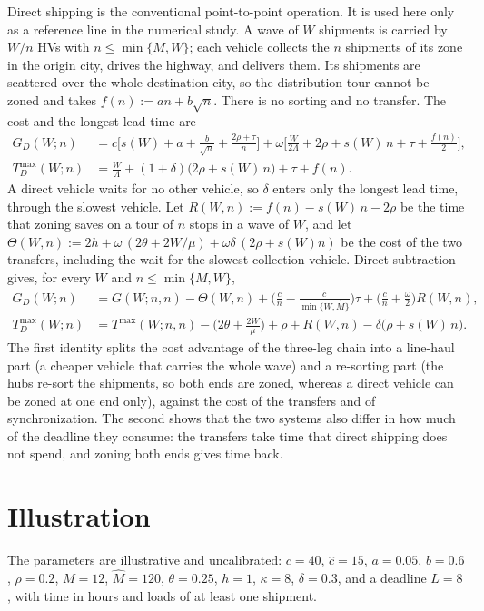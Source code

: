 \documentclass[10pt, reqno]{amsart}
\theoremstyle{definition}
\begin{document}
Direct shipping is the conventional point-to-point operation. It is used here only as a reference line in the numerical study. A wave of $W$ shipments is carried by $W/n$ HVs with $n\le\min\{M,W\}$; each vehicle collects the $n$ shipments of its zone in the origin city, drives the highway, and delivers them. Its shipments are scattered over the whole destination city, so the distribution tour cannot be zoned and takes $f(n):=an+b\sqrt n$. There is no sorting and no transfer. The cost and the longest lead time are
\begin{align}
G_D(W;n)&=c\Big[s(W)+a+\frac{b}{\sqrt n}+\frac{2\rho+\tau}{n}\Big]+\omega\Big[\frac{W}{2\Lambda}+2\rho+s(W)\,n+\tau+\frac{f(n)}{2}\Big],\label{eq:GD}\\
T_D^{\max}(W;n)&=\frac W\Lambda+(1+\delta)\big(2\rho+s(W)\,n\big)+\tau+f(n).\label{eq:TD}
\end{align}
A direct vehicle waits for no other vehicle, so $\delta$ enters only the longest lead time, through the slowest vehicle. Let $R(W,n):=f(n)-s(W)\,n-2\rho$ be the time that zoning saves on a tour of $n$ stops in a wave of $W$, and let $\Theta(W,n):=2h+\omega\,(2\theta+2W/\mu)+\omega\delta\,(2\rho+s(W)n)$ be the cost of the two transfers, including the wait for the slowest collection vehicle. Direct subtraction gives, for every $W$ and $n\le\min\{M,W\}$,
\begin{align}
G_D(W;n)&=G(W;n,n)-\Theta(W,n)+\Big(\frac cn-\frac{\hat c}{\min\{W,\hat M\}}\Big)\tau+\Big(\frac cn+\frac\omega2\Big)R(W,n),\label{eq:identity}\\
T_D^{\max}(W;n)&=T^{\max}(W;n,n)-\Big(2\theta+\frac{2W}{\mu}\Big)+\rho+R(W,n)-\delta\big(\rho+s(W)\,n\big).\label{eq:identityT}
\end{align}
The first identity splits the cost advantage of the three-leg chain into a line-haul part (a cheaper vehicle that carries the whole wave) and a re-sorting part (the hubs re-sort the shipments, so both ends are zoned, whereas a direct vehicle can be zoned at one end only), against the cost of the transfers and of synchronization. The second shows that the two systems also differ in how much of the deadline they consume: the transfers take time that direct shipping does not spend, and zoning both ends gives time back.

\section{Illustration}\label{sec:illustration}

The parameters are illustrative and uncalibrated: $c=40$, $\hat c=15$, $a=0.05$, $b=0.6$, $\rho=0.2$, $M=12$, $\hat M=120$, $\theta=0.25$, $h=1$, $\kappa=8$, $\delta=0.3$, and a deadline $L=8$, with time in hours and loads of at least one shipment.
\end{document}
